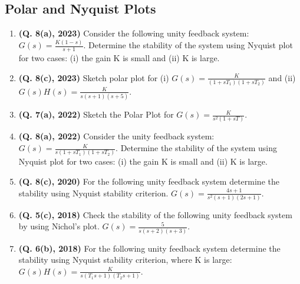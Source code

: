 \documentclass[12pt, a4paper]{article}
\begin{document}
	\subsection{Polar and Nyquist Plots}
	\begin{enumerate}
		\item \textbf{(Q. 8(a), 2023)} Consider the following unity feedback system: $G(s) = \frac{K(1-s)}{s+1}$. Determine the stability of the system using Nyquist plot for two cases: (i) the gain K is small and (ii) K is large.
		\item \textbf{(Q. 8(c), 2023)} Sketch polar plot for (i) $G(s) = \frac{K}{(1+sT_1)(1+sT_2)}$ and (ii) $G(s)H(s) = \frac{K}{s(s+1)(s+5)}$.
		\item \textbf{(Q. 7(a), 2022)} Sketch the Polar Plot for $G(s) = \frac{K}{s^2(1+sT)}$.
		\item \textbf{(Q. 8(a), 2022)} Consider the unity feedback system: $G(s) = \frac{K}{s(1+sT_1)(1+sT_2)}$. Determine the stability of the system using Nyquist plot for two cases: (i) the gain K is small and (ii) K is large.
		\item \textbf{(Q. 8(c), 2020)} For the following unity feedback system determine the stability using Nyquist stability criterion. $G(s) = \frac{4s+1}{s^2(s+1)(2s+1)}$.
		\item \textbf{(Q. 5(c), 2018)} Check the stability of the following unity feedback system by using Nichol's plot. $G(s) = \frac{5}{s(s+2)(s+3)}$.
		\item \textbf{(Q. 6(b), 2018)} For the following unity feedback system determine the stability using Nyquist stability criterion, where K is large: $G(s)H(s) = \frac{K}{s(T_1s+1)(T_2s+1)}$.
	\end{enumerate}
	
\end{document}
